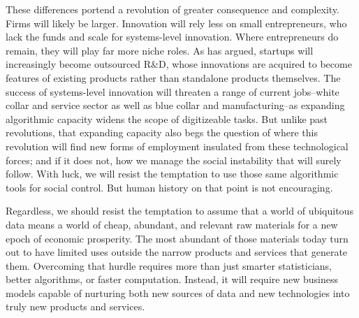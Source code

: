 \documentclass[12pt]{article}
\begin{document}
These differences portend a revolution of greater consequence and
complexity. Firms will likely be larger. Innovation will rely less on
small entrepreneurs, who lack the funds and scale for systems-level
innovation. Where entrepreneurs do remain, they will play far more
niche roles. As \cite{rao2012} has argued, startups will increasingly
become outsourced R\&D, whose innovations are acquired to become
features of existing products rather than standalone products
themselves. The success of systems-level innovation will threaten a
range of current jobs--white collar and service sector as well as blue
collar and manufacturing--as expanding algorithmic capacity widens the
scope of digitizeable tasks. But unlike past revolutions, that
expanding capacity also begs the question of where this revolution
will find new forms of employment insulated from these technological
forces; and if it does not, how we manage the social instability that
will surely follow. With luck, we will resist the temptation to use
those same algorithmic tools for social control. But human history on
that point is not encouraging.

Regardless, we should resist the temptation to assume that a world of
ubiquitous data means a world of cheap, abundant, and relevant raw
materials for a new epoch of economic prosperity. The most abundant of
those materials today turn out to have limited uses outside the narrow
products and services that generate them. Overcoming that hurdle
requires more than just smarter statisticians, better algorithms, or
faster computation. Instead, it will require new business models
capable of nurturing both new sources of data and new technologies
into truly new products and services. 









\end{document}
